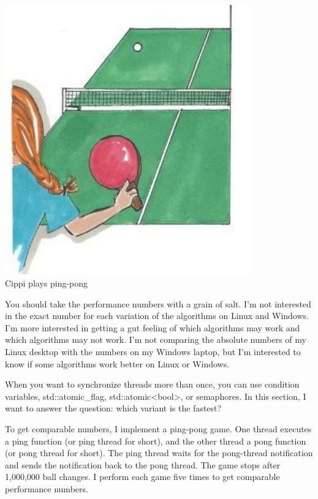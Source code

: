 
\begin{center}
\includegraphics[width=0.8\textwidth]{content/3/chapter7/images/1.png}\\
Cippi plays ping-pong
\end{center}

\begin{tcolorbox}[breakable,enhanced jigsaw,colback=blue!5!white,colframe=blue!75!black,title={The Reference PCs}]
You should take the performance numbers with a grain of salt. I’m not interested in the exact number for each variation of the algorithms on Linux and Windows. I’m more interested in getting a gut feeling of which algorithms may work and which algorithms may not work. I’m not comparing the absolute numbers of my Linux desktop with the numbers on my Windows laptop, but I’m interested to know if some algorithms work better on Linux or Windows.
\end{tcolorbox}

When you want to synchronize threads more than once, you can use condition variables, std::atomic\_flag, std::atomic<bool>, or semaphores. In this section, I want to answer the question: which variant is the fastest?

To get comparable numbers, I implement a ping-pong game. One thread executes a ping function (or ping thread for short), and the other thread a pong function (or pong thread for short). The ping thread waits for the pong-thread notification and sends the notification back to the pong thread. The game stops after 1,000,000 ball changes. I perform each game five times to get comparable performance numbers.

